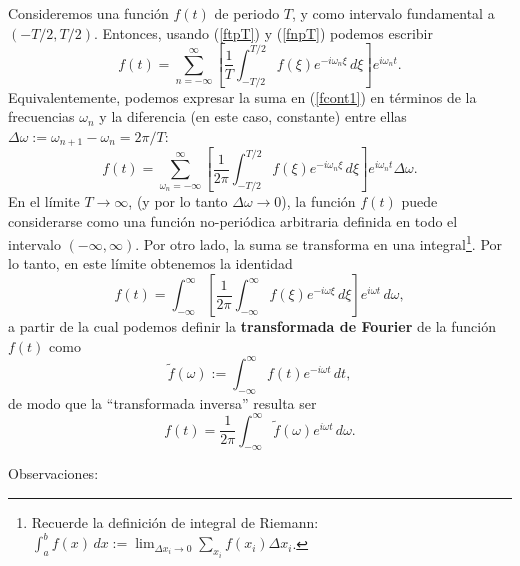 Consideremos una función $f(t)$ de periodo $T$, y como intervalo fundamental a $(-T/2,T/2)$. Entonces, usando (\ref{ftpT}) y (\ref{fnpT}) podemos escribir
\begin{equation}\label{fcont1}
f(t) =\sum_{n = -\infty}^\infty\left[\frac{1}{T}\int_{-T/2}^{T/2} f(\xi) e^{-i\omega_n\xi}\, d\xi\right] e^{i\omega_nt}.
\end{equation}
Equivalentemente, podemos expresar la suma en (\ref{fcont1}) en términos de la frecuencias $\omega_n$ y la diferencia (en este caso, constante) entre ellas $\Delta\omega:=\omega_{n+1}-\omega_n=2\pi/T$:
\begin{equation}
f(t) =\sum_{\omega_n = -\infty}^\infty\left[\frac{1}{2\pi}
\int_{-T/2}^{T/2} f(\xi) e^{-i\omega_n\xi}\,d\xi\right] e^{i\omega_n t}\Delta\omega.
\end{equation}
En el límite $T\to\infty$, (y por lo tanto $\Delta\omega\to 0$), la función $f(t)$ puede considerarse como una función no-periódica arbitraria definida en todo el intervalo $(-\infty,\infty)$. Por otro lado, la suma se transforma en una integral\footnote{Recuerde la definición de integral de Riemann: $\int_a^bf(x)\,dx:=\lim_{\Delta x_i\to 0}\sum_{x_i}f(x_i)\Delta x_i$.}. Por lo tanto, en este límite obtenemos la identidad
\begin{equation}\label{idfnp}
f(t) =\int_{-\infty}^\infty\left[\frac{1}{2\pi}\int_{-\infty}^\infty
 f(\xi) e^{-i\omega\xi}\,d\xi\right] e^{i\omega t}\,d\omega,
\end{equation}
a partir de la cual podemos definir la \textbf{transformada de Fourier} de la función $f(t)$ como
\begin{equation}\label{TFf}
\boxed{\tilde{f}(\omega) :=\int_{-\infty}^\infty f(t) e^{-i\omega t}\,dt,}
\end{equation}
de modo que la ``transformada inversa'' resulta ser
\begin{equation}\label{TFIf}
\boxed{f(t)=\frac{1}{2\pi}\int_{-\infty}^\infty\tilde{f}(\omega) e^{i\omega t} \,d\omega.}
\end{equation}



Observaciones:


